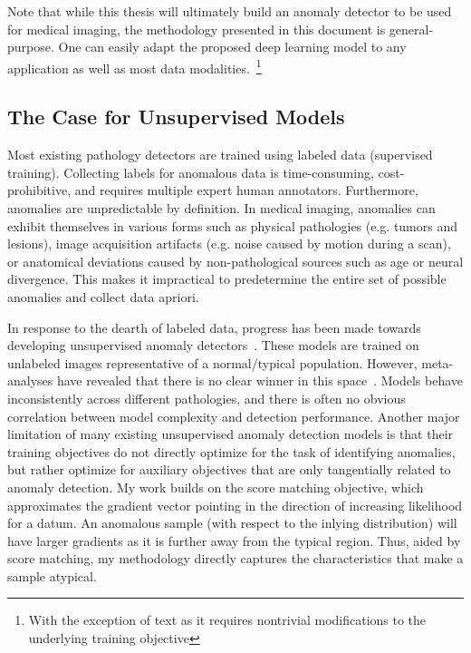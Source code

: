 Note that while this thesis will ultimately build an anomaly detector to be used for medical imaging, the methodology presented in this document is general-purpose. One can easily adapt the proposed deep learning model to any application as well as most data modalities.~\footnote{With the exception of text as it requires nontrivial modifications to the underlying training objective}



\subsection*{The Case for Unsupervised Models}

Most existing pathology detectors are trained using labeled data (supervised training). Collecting labels for anomalous data is time-consuming, cost-prohibitive, and requires multiple expert human annotators.  Furthermore, anomalies are unpredictable by definition. In medical imaging, anomalies can exhibit themselves in various forms such as physical pathologies (e.g. tumors and lesions), image acquisition artifacts (e.g. noise caused by motion during a scan), or anatomical deviations caused by non-pathological sources such as age or neural divergence.
This makes it impractical to predetermine the entire set of possible anomalies and collect data apriori.

In response to the dearth of labeled data, progress has been made towards developing unsupervised anomaly detectors~\cite{bergmann2020uninformed,baur_deep_2019,ruff_unifying_2021}. These models are trained on unlabeled images representative of a normal/typical population.
However, meta-analyses have revealed that there is no clear winner in this space~\cite{baur2021,ruff_unifying_2021}. Models behave inconsistently across different pathologies, and there is often no obvious correlation between model complexity and detection performance. Another major limitation of many existing unsupervised anomaly detection models is that their training objectives do not directly optimize for the task of identifying anomalies, but rather optimize for auxiliary objectives that are only tangentially related to anomaly detection.
My work builds on the score matching objective, which approximates the gradient vector pointing in the direction of increasing likelihood for a datum. An anomalous sample (with respect to the inlying distribution) will have larger gradients as it is further away from the typical region. Thus, aided by score matching, my methodology directly captures the characteristics that make a sample atypical.

